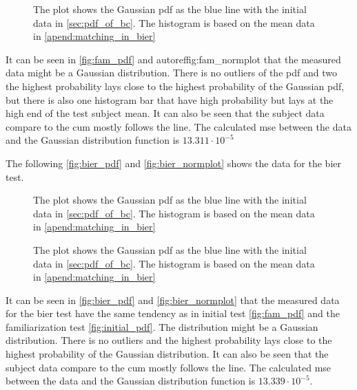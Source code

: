 {{ \begin{figure}[H]
	\centering
	
		\caption{The plot shows the Gaussian  \gls{pdf} as the blue line with the initial data in \autoref{sec:pdf_of_bc}. The histogram is based on the mean data in \autoref{apend:matching_in_bier}}
		\label{fig:fam_normplot}
\end{figure}

It can be seen in \autoref{fig:fam_pdf} and autoref{fig:fam_normplot}  that the measured data might be a Gaussian distribution. There is no outliers of the \gls{pdf} and two the highest probability lays close to the highest probability of the Gaussian \gls{pdf}, but there is also one histogram bar that have high probability but lays at the high end of the test subject mean. It can also be seen that the subject data compare to the \gls{cum} mostly follows the line. The calculated \gls{mse} between the data and the Gaussian distribution function is $13.311 \cdot 10^{-5}$

The following \autoref{fig:bier_pdf} and \autoref{fig:bier_normplot} shows the data for the \gls{bier} test.
 \begin{figure}[H]
	\centering
	
		\caption{The plot shows the Gaussian  \gls{pdf} as the blue line with the initial data in \autoref{sec:pdf_of_bc}. The histogram is based on the mean data in \autoref{apend:matching_in_bier}}
		\label{fig:bier_pdf}
\end{figure}

 \begin{figure}[H]
	\centering
	
		\caption{The plot shows the Gaussian  \gls{pdf} as the blue line with the initial data in \autoref{sec:pdf_of_bc}. The histogram is based on the mean data in \autoref{apend:matching_in_bier}}
		\label{fig:bier_normplot}
\end{figure}

It can be seen in \autoref{fig:bier_pdf} and \autoref{fig:bier_normplot} that the measured data for the \gls{bier} test have the same tendency as in initial test \autoref{fig:fam_pdf} and the familiarization test \autoref{fig:initial_pdf}. The distribution might be a Gaussian distribution. There is no outliers and the highest probability lays close to the highest probability of the Gaussian distribution.  It can also be seen that the subject data compare to the \gls{cum} mostly follows the line. The calculated \gls{mse} between the data and the Gaussian distribution function is $13.339 \cdot 10^{-5}$.



}}
